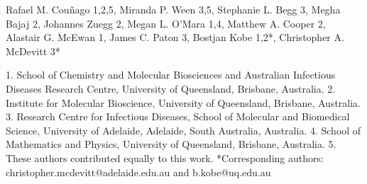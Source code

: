 Rafael M. Couñago 1,2,5, Miranda P. Ween 3,5, Stephanie L. Begg 3, Megha Bajaj 2, Johannes Zuegg 2, Megan L. O’Mara 1,4, Matthew A. Cooper 2, Alastair G. McEwan 1, James C. Paton 3, Bostjan Kobe 1,2*, Christopher A. McDevitt 3*

1. School of Chemistry and Molecular Biosciences and Australian Infectious Diseases Research Centre, University of Queensland, Brisbane, Australia.
2. Institute for Molecular Bioscience, University of Queensland, Brisbane, Australia.
3. Research Centre for Infectious Diseases, School of Molecular and Biomedical Science, University of Adelaide, Adelaide, South Australia, Australia.
4. School of Mathematics and Physics, University of Queensland, Brisbane, Australia.
5. These authors contributed equally to this work.
*Corresponding authors: christopher.mcdevitt@adelaide.edu.au and b.kobe@uq.edu.au
